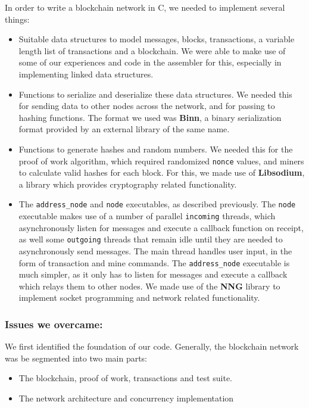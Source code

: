 \documentclass[a4paper]{article}
\begin{document}
In order to write a blockchain network in C, we needed to implement several things:
\begin{itemize}
    \item Suitable data structures to model messages, blocks, transactions, a variable length list of transactions and a blockchain. We were able to make use of some of our experiences and code in the assembler for this, especially in implementing linked data structures.
    \item Functions to serialize and deserialize these data structures. We needed this for sending data to other nodes across the network, and for passing to hashing functions. The format we used was \textbf{Binn}, a binary serialization format provided by an external library of the same name.
    \item Functions to generate hashes and random numbers. We needed this for the proof of work algorithm, which required randomized \verb|nonce| values, and miners to calculate valid hashes for each block. For this, we made use of \textbf{Libsodium}, a library which provides cryptography related functionality.
    \item The \verb|address_node| and \verb|node| executables, as described previously. The \verb|node| executable makes use of a number of parallel \verb|incoming| threads, which asynchronously listen for messages and execute a callback function on receipt, as well some \verb|outgoing| threads that remain idle until they are needed to asynchronously send messages. The main thread handles user input, in the form of transaction and mine commands. The \verb|address_node| executable is much simpler, as it only has to listen for messages and execute a callback which relays them to other nodes. We made use of the \textbf{NNG} library to implement socket programming and network related functionality.
\end{itemize}

\subsubsection{Issues we overcame: }
We first identified the foundation of our code. Generally, the blockchain network was be segmented into two main parts:

\begin{itemize}
    \item The blockchain, proof of work, transactions and test suite.
    \item The network architecture and concurrency implementation
\end{itemize}
\end{document}
